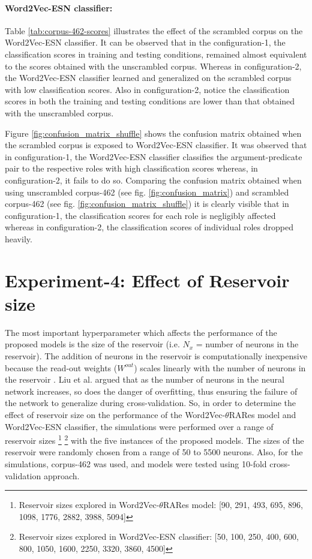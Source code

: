\paragraph{Word2Vec-ESN classifier:} Table \ref{tab:corpus-462-scores} illustrates the effect of the scrambled corpus on the Word2Vec-ESN classifier. It can be observed that in the configuration-1, the classification scores in training and testing conditions, remained almost equivalent to the scores obtained with the unscrambled corpus. Whereas in configuration-2, the Word2Vec-ESN classifier learned and generalized on the scrambled corpus with low classification scores. Also in configuration-2, notice the classification scores in both the training and testing conditions are lower than that obtained with the unscrambled corpus. 

Figure \ref{fig:confusion_matrix_shuffle} shows the confusion matrix obtained when the scrambled corpus is exposed to Word2Vec-ESN classifier. It was observed that in configuration-1, the Word2Vec-ESN classifier classifies the argument-predicate pair to the respective roles with high classification scores whereas, in configuration-2, it fails to do so. Comparing the confusion matrix obtained when using unscrambled corpus-462 (see fig. \ref{fig:confusion_matrix}) and scrambled corpus-462 (see fig. \ref{fig:confusion_matrix_shuffle}) it is clearly visible that in configuration-1, the classification scores for each role is negligibly affected whereas in configuration-2, the classification scores of individual roles dropped heavily.

\section{Experiment-4: Effect of Reservoir size}

The most important hyperparameter which affects the performance of the proposed models is the size of the reservoir (i.e. $N_{x}$ = number of neurons in the reservoir). The addition of neurons in the reservoir is computationally inexpensive because the read-out weights ($W^{out}$) scales linearly with the number of neurons in the reservoir \cite{esn:learn_gs}. Liu et al. \cite{overfitting:liu} argued that as the number of neurons in the neural network increases, so does the danger of overfitting, thus ensuring the failure of the network to generalize during cross-validation. So, in order to determine the effect of reservoir size on the performance of the Word2Vec-$\theta$RARes model and Word2Vec-ESN classifier, the simulations were performed over a range of reservoir sizes \footnote[1]{Reservoir sizes explored in Word2Vec-$\theta$RARes model: [90, 291, 493, 695, 896, 1098, 1776, 2882, 3988, 5094]} \footnote[2]{Reservoir sizes explored in Word2Vec-ESN classifier: [50, 100, 250, 400, 600, 800, 1050, 1600, 2250, 3320, 3860, 4500]} with the five instances of the proposed models. The sizes of the reservoir were randomly chosen from a range of 50 to 5500 neurons. Also, for the simulations, corpus-462 was used, and models were tested using 10-fold cross-validation approach.

